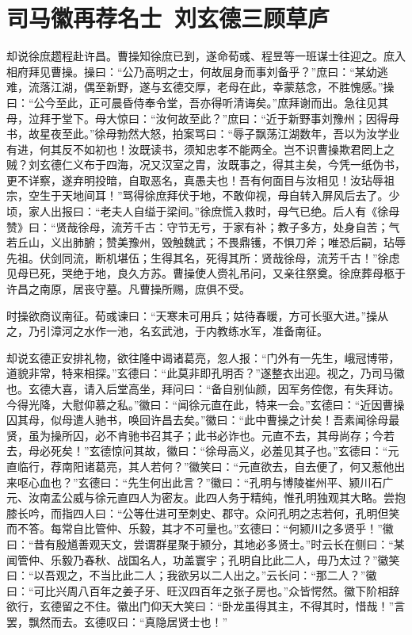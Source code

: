 \chapter{司马徽再荐名士~刘玄德三顾草庐}

却说徐庶趱程赴许昌。曹操知徐庶已到，遂命荀彧、程昱等一班谋士往迎之。庶入相府拜见曹操。操曰：“公乃高明之士，何故屈身而事刘备乎？”庶曰：“某幼逃难，流落江湖，偶至新野，遂与玄德交厚，老母在此，幸蒙慈念，不胜愧感。”操曰：“公今至此，正可晨昏侍奉令堂，吾亦得听清诲矣。”庶拜谢而出。急往见其母，泣拜于堂下。母大惊曰：“汝何故至此？”庶曰：“近于新野事刘豫州；因得母书，故星夜至此。”徐母勃然大怒，拍案骂曰：“辱子飘荡江湖数年，吾以为汝学业有进，何其反不如初也！汝既读书，须知忠孝不能两全。岂不识曹操欺君罔上之贼？刘玄德仁义布于四海，况又汉室之胄，汝既事之，得其主矣，今凭一纸伪书，更不详察，遂弃明投暗，自取恶名，真愚夫也！吾有何面目与汝相见！汝玷辱祖宗，空生于天地间耳！”骂得徐庶拜伏于地，不敢仰视，母自转入屏风后去了。少顷，家人出报曰：“老夫人自缢于梁间。”徐庶慌入救时，母气已绝。后人有《徐母赞》曰：“贤哉徐母，流芳千古：守节无亏，于家有补；教子多方，处身自苦；气若丘山，义出肺腑；赞美豫州，毁触魏武；不畏鼎镬，不惧刀斧；唯恐后嗣，玷辱先祖。伏剑同流，断机堪伍；生得其名，死得其所：贤哉徐母，流芳千古！”徐虑见母已死，哭绝于地，良久方苏。曹操使人赍礼吊问，又亲往祭奠。徐庶葬母柩于许昌之南原，居丧守墓。凡曹操所赐，庶俱不受。

时操欲商议南征。荀彧谏曰：“天寒未可用兵；姑待春暖，方可长驱大进。”操从之，乃引漳河之水作一池，名玄武池，于内教练水军，准备南征。

却说玄德正安排礼物，欲往隆中谒诸葛亮，忽人报：“门外有一先生，峨冠博带，道貌非常，特来相探。”玄德曰：“此莫非即孔明否？”遂整衣出迎。视之，乃司马徽也。玄德大喜，请入后堂高坐，拜问曰：“备自别仙颜，因军务倥偬，有失拜访。今得光降，大慰仰慕之私。”徽曰：“闻徐元直在此，特来一会。”玄德曰：“近因曹操囚其母，似母遣人驰书，唤回许昌去矣。”徽曰：“此中曹操之计矣！吾素闻徐母最贤，虽为操所囚，必不肯驰书召其子；此书必诈也。元直不去，其母尚存；今若去，母必死矣！”玄德惊问其故，徽曰：“徐母高义，必羞见其子也。”玄德曰：“元直临行，荐南阳诸葛亮，其人若何？”徽笑曰：“元直欲去，自去便了，何又惹他出来呕心血也？”玄德曰：“先生何出此言？”徽曰：“孔明与博陵崔州平、颍川石广元、汝南孟公威与徐元直四人为密友。此四人务于精纯，惟孔明独观其大略。尝抱膝长吟，而指四人曰：“公等仕进可至刺史、郡守。众问孔明之志若何，孔明但笑而不答。每常自比管仲、乐毅，其才不可量也。”玄德曰：“何颍川之多贤乎！”徽曰：“昔有殷馗善观天文，尝谓群星聚于颍分，其地必多贤士。”时云长在侧曰：“某闻管仲、乐毅乃春秋、战国名人，功盖寰宇；孔明自比此二人，毋乃太过？”徽笑曰：“以吾观之，不当比此二人；我欲另以二人出之。”云长问：“那二人？”徽曰：“可比兴周八百年之姜子牙、旺汉四百年之张子房也。”众皆愕然。徽下阶相辞欲行，玄德留之不住。徽出门仰天大笑曰：“卧龙虽得其主，不得其时，惜哉！”言罢，飘然而去。玄德叹曰：“真隐居贤士也！”


